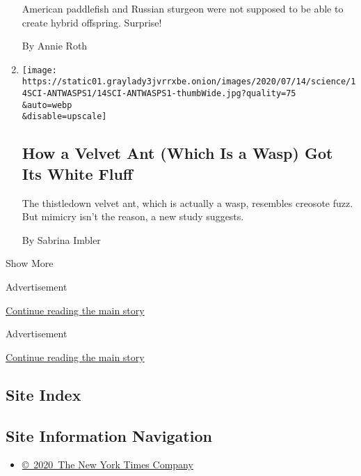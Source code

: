 \begin{enumerate}
  American paddlefish and Russian sturgeon were not supposed to be able
  to create hybrid offspring. Surprise!

  By Annie Roth
\item
  \href{/2020/07/14/science/white-fluffy-ant-wasp.html}{}

  \texttt{[image: https://static01.graylady3jvrrxbe.onion/images/2020/07/14/science/14SCI-ANTWASPS1/14SCI-ANTWASPS1-thumbWide.jpg?quality=75\\\&auto=webp\\\&disable=upscale]}

  \hypertarget{how-a-velvet-ant-which-is-a-wasp-got-its-white-fluff}{%
  \subsection{How a Velvet Ant (Which Is a Wasp) Got Its White
  Fluff}\label{how-a-velvet-ant-which-is-a-wasp-got-its-white-fluff}}

  The thistledown velvet ant, which is actually a wasp, resembles
  creosote fuzz. But mimicry isn't the reason, a new study suggests.

  By Sabrina Imbler
\end{enumerate}

Show More

Advertisement

\protect\hyperlink{after-mid1}{Continue reading the main story}

Advertisement

\protect\hyperlink{after-mktg}{Continue reading the main story}

\hypertarget{site-index}{%
\subsection{Site Index}\label{site-index}}

\hypertarget{site-information-navigation}{%
\subsection{Site Information
Navigation}\label{site-information-navigation}}

\begin{itemize}
\tightlist
\item
  \href{https://help.nytimes3xbfgragh.onion/hc/en-us/articles/115014792127-Copyright-notice}{©~2020~The
  New York Times Company}
\end{itemize}


